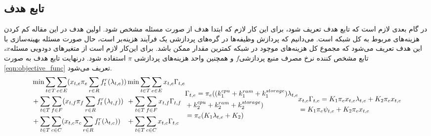 	\subsection{تابع هدف}
	در گام بعدی لازم است که تابع هدف تعریف شود، برای این کار لازم که ابتدا هدف از صورت مسئله مشخص شود. اولین هدف در این مقاله کم کردن هزینه‌های مربوط به کل شبکه است. می‌دانیم که پردازش وظیفه‌ها در گره‌های پردازشی یک فرآیند هزینه‌بر است، حال صورت مسئله بهینه‌سازی با این هدف تعریف می‌شود که مجموع کل هزینه‌های موچود در شبکه کمترین مقدار ممکن باشد. برای این‌کار لازم است از متغیرهای دودویی مسئله$x$، تابع مشخص کننده نرخ مصرف منبع پردازشی$f$ و همچنین واحد هزینه‌های پردازشی $\pi$ استفاده شود. درنهایت تابع هدف به صورت \cref{eqn:objective_func} تعریف می‌شود. 
	\begin{subequations}\label{eqn:objective_func}
		\begin{align}
		& \notag \min \sum_{t \in T}\sum_{e \in E} (x_{t,e}\pi_e\sum_{r \in R}f_t^r(\lambda_{t,e})) \\
		&\notag + \sum_{t \in T}\sum_{f \in F} (x_{t,f}\pi_f\sum_{r \in R}f_t^r(\lambda_{t,f})) \\
		& + \sum_{t \in T}\sum_{c \in C} (x_{t,c}\pi_c\sum_{r \in R}f_t^r(\lambda_{t,c}))
		\end{align}
		\begin{align}
		& \notag \min \sum_{t \in T}\sum_{e \in E} x_{t,e}\Gamma_{t,e} \\
		& \notag + \sum_{t \in T}\sum_{f \in F} x_{t,f}\Gamma_{t,f} \\
		& + \sum_{t \in T}\sum_{c \in C} x_{t,c}\Gamma_{t,c}
		\end{align}
		\begin{align}\label{eqn:def_Gamma}
		&\notag \Gamma_{t,e} = \pi_e((k_1^{cpu}+k_1^{ram}+k_1^{storage})\lambda_{t,e} \\
		&\notag +k_2^{cpu}+k_2^{ram}+k_2^{storage}) \\
		& = \pi_e(K_1\lambda_{t,e}+K_2)
		\end{align}
		\begin{align}
		&\notag x_{t,e}\Gamma_{t,e} = K_1\pi_ex_{t,e}\lambda_{t,e} + K_2\pi_ex_{t,e} \\
		&= K_1\pi_e\psi_{t,e} + K_2\pi_ex_{t,e}
		\end{align}
	\end{subequations}


